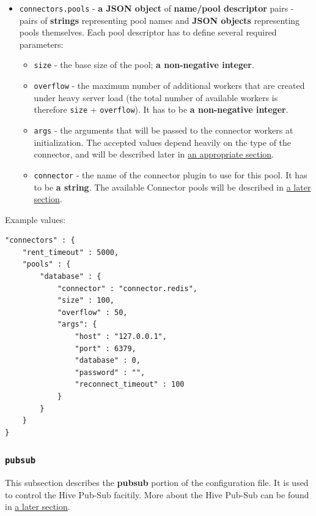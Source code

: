 \documentclass[a4paper]{article}
\begin{document}
\label{ref-connectors_config}

\begin{itemize}
\item \texttt{connectors.pools} - \textbf{a JSON object} of \textbf{name/pool descriptor} pairs - pairs of \textbf{strings} representing pool names and \textbf{JSON objects} representing pools themselves. Each pool descriptor has to define several required parameters:
\begin{itemize}
\item \texttt{size} - the base size of the pool; \textbf{a non-negative integer}.
\item \texttt{overflow} - the maximum number of additional workers that are created under heavy server load (the total number of available workers is therefore \texttt{size} + \texttt{overflow}). It has to be \textbf{a non-negative integer}.
\item \texttt{args} - the arguments that will be passed to the connector workers at initialization. The accepted values depend heavily on the type of the connector, and will be described later in \hyperref[sec-9-4]{an appropriate section}.
\item \texttt{connector} - the name of the connector plugin to use for this pool. It has to be \textbf{a string}. The available Connector pools will be described in \hyperref[sec-9-4]{a later section}.
\end{itemize}
\end{itemize}

\noindent
Example values:


\begin{verbatim}
"connectors" : {
    "rent_timeout" : 5000,
    "pools" : {
        "database" : {
            "connector" : "connector.redis",
            "size" : 100,
            "overflow" : 50,
            "args": {
                "host" : "127.0.0.1",
                "port" : 6379,
                "database" : 0,
                "password" : "",
                "reconnect_timeout" : 100
            }
        }
    }
}
\end{verbatim}
\subsubsection{\texttt{pubsub}}
\label{sec-3-1-5}

This subsection describes the \textbf{pubsub} portion of the configuration file. It is used to control the Hive Pub-Sub facitily. More about the Hive Pub-Sub can be found in \hyperref[sec-7-3]{a later section}.
\end{document}
